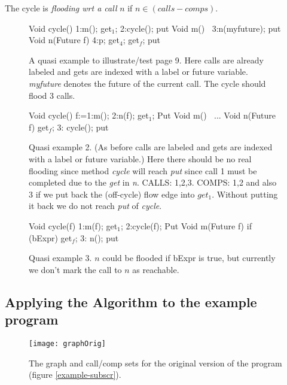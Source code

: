 \documentclass[12pt]{article}%
\begin{document}
\begin{theorem}
The cycle is \emph{flooding wrt a call} $n$ if 
$n\in (calls -comps)$.
\end{theorem}


\begin{figure}[h]
\begin{abs}
Void cycle()      {1:m(); get$_1$; 2:cycle(); put}
Void m()$\ \ \ \ ${3:n(myfuture); put}
Void n(Future f)  {4:p; get$_4$; get$_f$; put}
\end{abs}
\caption{\label{example-quasi}
A  quasi example to illustrate/test page 9.
Here calls are already labeled and gets are indexed with
a label or future variable. \emph{myfuture} denotes the
future of the current call. The cycle should flood 3 calls.}
\end{figure}



\begin{figure}[h]
\begin{abs}
Void cycle()      {f:=1:m(); 2:n(f); get$_1$; Put}
Void m()$\ \ \ \ ${...}
Void n(Future f)  {get$_f$; 3: cycle(); put}
\end{abs}
\caption{\label{example-quasi2}
  Quasi example 2.
(As before calls are  labeled and gets are indexed with
a label or future variable.) 
%
Here there should be no real flooding since method
 \emph{cycle} will reach  \emph{put} since call 1 must be completed
due to the   \emph{get} in  \emph{n}.
CALLS: 1,2,3.  
COMPS: 1,2 and also 3 if we put back the (off-cycle)  flow edge into 
 $get_1$.
Without putting it back we do not reach \emph{put} of \emph{cycle}.
}
\end{figure}


\begin{figure}[h]
\begin{abs}
Void cycle(f)      {1:m(f); get$_1$; 2:cycle(f); Put}
Void m(Future f)  {if (bExpr) {get$_f$; 3: n();}  put}
\end{abs}
\caption{\label{example-quasi3}
  Quasi example 3.
%
$n$ could be flooded if bExpr is true, but currently we don't mark the call to $n$ as reachable.
}
\end{figure}

\subsection{Applying the Algorithm to the example program}


\begin{figure}[t]
\texttt{[image: graphOrig]}
\caption{\label{graph-orig}
The graph and call/comp sets for the original version of the program (figure \ref{example-subscr}).
}
\end{figure}
\end{document}
